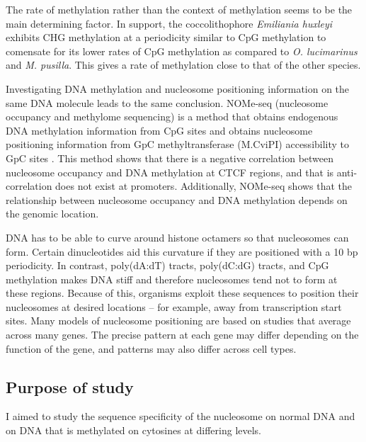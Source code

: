\documentclass[parskip=full, numbers=noenddot]{scrreprt}
\begin{document}
The rate of methylation rather than the context of methylation seems to be the main determining factor.  In support, the coccolithophore \emph{Emiliania huxleyi} exhibits CHG methylation at a periodicity similar to CpG methylation to comensate for its lower rates of CpG methylation as compared to \emph{O. lucimarinus} and \emph{M. pusilla}.  This gives a rate of methylation close to that of the other species.

Investigating DNA methylation and nucleosome positioning information on the same DNA molecule leads to the same conclusion.  NOMe-seq (nucleosome occupancy and methylome sequencing) is a method that obtains endogenous DNA methylation information from CpG sites and obtains nucleosome positioning information from GpC methyltransferase (M.CviPI) accessibility to GpC sites \citep{kelly_genome-wide_2012}.  This method shows that there is a negative correlation between nucleosome occupancy and DNA methylation at CTCF regions, and that is anti-correlation does not exist at promoters.  Additionally, NOMe-seq shows that the relationship between nucleosome occupancy and DNA methylation depends on the genomic location.


DNA has to be able to curve around histone octamers so that nucleosomes can form.  Certain dinucleotides aid this curvature if they are positioned with a 10 bp periodicity.  In contrast, poly(dA:dT) tracts, poly(dC:dG) tracts, and CpG methylation makes DNA stiff and therefore nucleosomes tend not to form at these regions.  Because of this, organisms exploit these sequences to position their nucleosomes at desired locations -- for example, away from transcription start sites.  Many models of nucleosome positioning are based on studies that average across many genes.  The precise pattern at each gene may differ depending on the function of the gene, and patterns may also differ across cell types.


\subsection{Purpose of study}
\label{ssec:emsaselex_intro_why}

I aimed to study the sequence specificity of the nucleosome on normal DNA and on DNA that is methylated on cytosines at differing levels.
\end{document}
